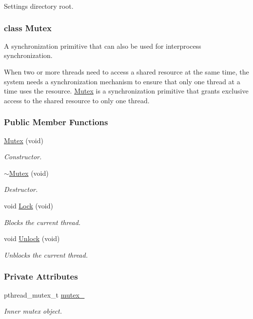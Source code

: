 Settings directory root. 

\label{class_mutex}
\hypertarget{group___core_class_mutex}{}
\subsubsection{class Mutex}
A synchronization primitive that can also be used for interprocess synchronization. 

When two or more threads need to access a shared resource at the same time, the system needs a synchronization mechanism to ensure that only one thread at a time uses the resource. \hyperlink{group___core_class_mutex}{Mutex} is a synchronization primitive that grants exclusive access to the shared resource to only one thread. \subsubsection*{Public Member Functions}
\begin{DoxyCompactItemize}
\item 
\hyperlink{group___core_a00b2ff557451955a905ecdca2855389b}{Mutex} (void)
\begin{DoxyCompactList}\small\item\em Constructor. \end{DoxyCompactList}\item 
\hyperlink{group___core_a115e8bae072b7d0767f75bc3369d521d}{$\sim$\-Mutex} (void)
\begin{DoxyCompactList}\small\item\em Destructor. \end{DoxyCompactList}\item 
void \hyperlink{group___core_a1726d7244983f7be74fcfa9cfb63745f}{Lock} (void)
\begin{DoxyCompactList}\small\item\em Blocks the current thread. \end{DoxyCompactList}\item 
void \hyperlink{group___core_a03150e8fa423f7e042661d350d238b84}{Unlock} (void)
\begin{DoxyCompactList}\small\item\em Unblocks the current thread. \end{DoxyCompactList}\end{DoxyCompactItemize}
\subsubsection*{Private Attributes}
\begin{DoxyCompactItemize}
\item 
pthread\-\_\-mutex\-\_\-t \hyperlink{group___core_a0f845aa1acc03f39fd84612c91050f27}{mutex\-\_\-}
\begin{DoxyCompactList}\small\item\em Inner mutex object. \end{DoxyCompactList}\end{DoxyCompactItemize}


